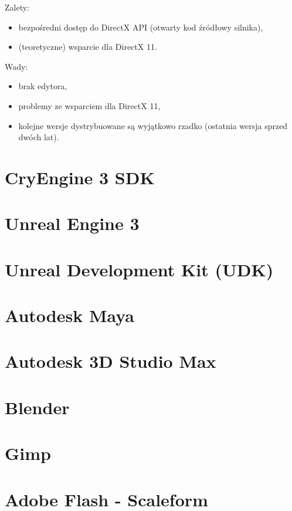 Zalety:
\begin{itemize}
\item bezpośredni dostęp do DirectX API (otwarty kod źródłowy silnika),
\item (teoretyczne) wsparcie dla DirectX 11.
\end{itemize}

Wady:
\begin{itemize}
\item brak edytora,
\item problemy ze wsparciem dla DirectX 11,
\item kolejne wersje dystrybuowane są wyjątkowo rzadko (ostatnia wersja sprzed dwóch lat).
\end{itemize}

\section{CryEngine 3 SDK}

\section{Unreal Engine 3}

\section{Unreal Development Kit (UDK)}

\section{Autodesk Maya}

\section{Autodesk 3D Studio Max}

\section{Blender}

\section{Gimp}

\section{Adobe Flash - Scaleform}

